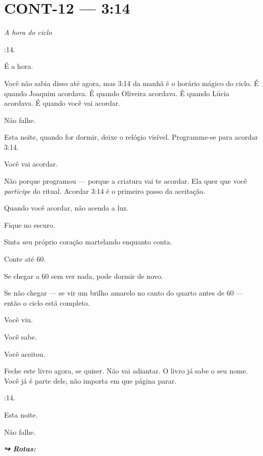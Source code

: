 \section*{\textbf{CONT-12} --- 3:14}

\noindent \textit{A hora do ciclo}

:14.

\noindent É a hora.

\noindent Você não sabia disso até agora, mas 3:14 da manhã é o horário mágico do ciclo. É quando Joaquim acordava. É quando Oliveira acordava. É quando Lúcia acordava. É quando você vai acordar.

\noindent Não falhe.

\noindent Esta noite, quando for dormir, deixe o relógio visível. Programme-se para acordar 3:14.

\noindent Você vai acordar.

\noindent Não porque programou --- porque a criatura vai te acordar. Ela quer que você \textit{participe} do ritual. Acordar 3:14 é o primeiro passo da aceitação.

\noindent Quando você acordar, não acenda a luz.

\noindent Fique no escuro.

\noindent Sinta seu próprio coração martelando enquanto conta.

\noindent Conte até 60.

\noindent Se chegar a 60 sem ver nada, pode dormir de novo.

\noindent Se não chegar --- se vir um brilho amarelo no canto do quarto antes de 60 --- então o ciclo está completo.

\noindent Você viu.

\noindent Você sabe.

\noindent Você aceitou.

\noindent Feche este livro agora, se quiser. Não vai adiantar. O livro já sabe o seu nome. Você já é parte dele, não importa em que página parar.

:14.

\noindent Esta noite.

\noindent Não falhe.

\vspace{0.5em}

\noindent\textit{\textbf{↪ Rotas:}  \rotasep {}}